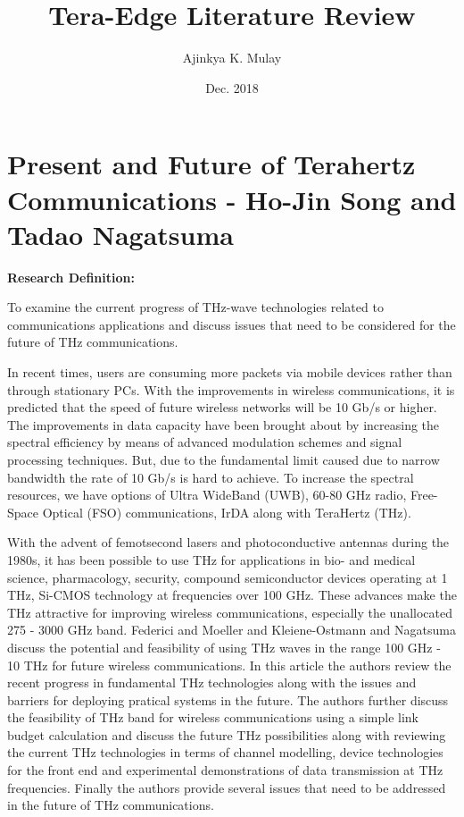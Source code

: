 \documentclass[12pt, letterpaper]{article}
\title{Tera-Edge Literature Review}
\author{Ajinkya K. Mulay}
\date{Dec. 2018}
\begin{document}
	\begin{titlepage}
		\maketitle
	\end{titlepage}
	
	\section{Present and Future of Terahertz Communications - Ho-Jin Song and Tadao Nagatsuma}
	\textbf{Research Definition:} 
	\par
	To examine the current progress of THz-wave technologies related to communications applications and discuss issues that need to be considered for the future of THz communications. 
	\par
	In recent times, users are consuming more packets via mobile devices rather than through stationary PCs. With the improvements in wireless communications, it is predicted that the speed of future wireless networks will be 10 Gb/s or higher. The improvements in data capacity have been brought about by increasing the spectral efficiency by means of advanced modulation schemes and signal processing techniques. But, due to the fundamental limit caused due to narrow bandwidth the rate of 10 Gb/s is hard to achieve. To increase the spectral resources, we have options of Ultra WideBand (UWB), 60-80 GHz radio, Free-Space Optical (FSO) communications, IrDA along with TeraHertz (THz).
	\par 
	With the advent of femotsecond lasers and photoconductive antennas during the 1980s, it has been possible to use THz for applications in bio- and medical science, pharmacology, security, compound semiconductor devices operating at 1 THz, Si-CMOS technology at frequencies over 100 GHz. These advances make the THz attractive for improving wireless communications, especially the unallocated 275 - 3000 GHz band. Federici and Moeller and Kleiene-Ostmann and Nagatsuma discuss the potential and feasibility of using THz waves in the range 100 GHz - 10 THz for future wireless communications. In this article the authors review the recent progress in fundamental THz technologies along with the issues and barriers for deploying pratical systems in the future. The authors further discuss the feasibility of THz band for wireless communications using a simple link budget calculation and discuss the future THz possibilities along with reviewing the current THz technologies in terms of channel modelling, device technologies for the front end and experimental demonstrations of data transmission at THz frequencies. Finally the authors provide several issues that need to be addressed in the future of THz communications. 
\end{document}
